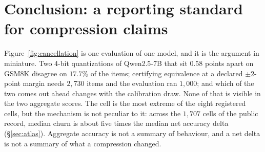 %
%
%

\section{Conclusion: a reporting standard for compression claims}
\label{sec:conclusion}

%
Figure~\ref{fig:cancellation} is one evaluation of one model, and it is the
argument in miniature. Two 4-bit quantizations of Qwen2.5-7B that sit $0.58$
points apart on GSM8K disagree on $17.7\%$ of the items; certifying equivalence
at a declared $\pm 2$-point margin needs $2{,}730$ items and the evaluation ran
$1{,}000$; and which of the two comes out ahead changes with the calibration
draw. None of that is visible in the two aggregate scores. The cell is the most
extreme of the eight registered cells, but the mechanism is not peculiar to it:
across the $1{,}707$ cells of the public record, median churn is about five
times the median net accuracy delta (\S\ref{sec:atlas}). Aggregate accuracy is
not a summary of behaviour, and a net delta is not a summary of what a
compression changed.

